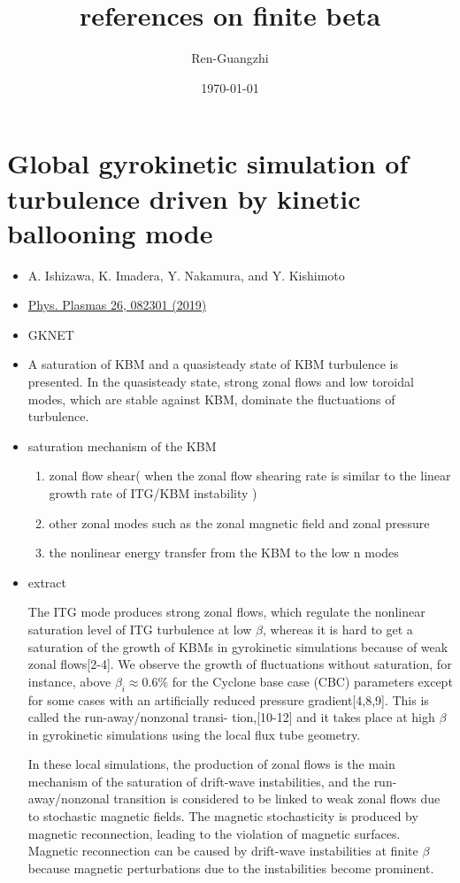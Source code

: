 \documentclass[11pt,a4paper]{article}
\title{references on finite beta}
\author{Ren-Guangzhi}
\date{\today}
\begin{document}
	
\maketitle
\tableofcontents

\newpage

\section{Global gyrokinetic simulation of turbulence driven by kinetic ballooning mode}	
	\begin{itemize}
		\item A. Ishizawa, K. Imadera, Y. Nakamura, and Y. Kishimoto
		\item \href{https://aip.scitation.org/doi/10.1063/1.5100308}{Phys. Plasmas 26, 082301 (2019)} 
		\item GKNET
		\item A saturation of KBM and a quasisteady state of KBM turbulence is presented. In the quasisteady state, strong zonal flows and low toroidal
		modes, which are stable against KBM, dominate the fluctuations of
		turbulence.
		\item saturation mechanism of the KBM
		\begin{enumerate}
			\item zonal flow shear( when the zonal flow shearing rate is similar to the linear growth rate of ITG/KBM instability )
			\item other zonal modes such as the zonal magnetic field and zonal pressure
			\item the nonlinear energy transfer from the KBM to the low n modes
			
		\end{enumerate}

	\item extract 
	
	The ITG mode produces strong zonal flows, which regulate the nonlinear saturation level of ITG turbulence at low $\beta$, whereas it is hard to get a saturation of the growth of KBMs in gyrokinetic simulations because of weak zonal flows[2-4]. We observe the growth of fluctuations without saturation, for instance, above $\beta_i \approx 0.6\%$ for the Cyclone base case (CBC) parameters except for some cases with an artificially reduced pressure gradient[4,8,9]. This is called the run-away/nonzonal transi-
	tion,[10-12] and it takes place at high $\beta$ in gyrokinetic simulations using the local flux tube geometry. 
	
	In these local simulations, the production of zonal flows is the main mechanism of the saturation of drift-wave instabilities, and the run-away/nonzonal transition is considered to be linked to weak zonal flows due to stochastic magnetic fields. The magnetic stochasticity is produced by magnetic reconnection, leading to the violation of magnetic surfaces. Magnetic reconnection can be caused by drift-wave instabilities at finite $\beta$ because magnetic perturbations due to the instabilities become prominent. 
	

\end{itemize}
\end{document}
